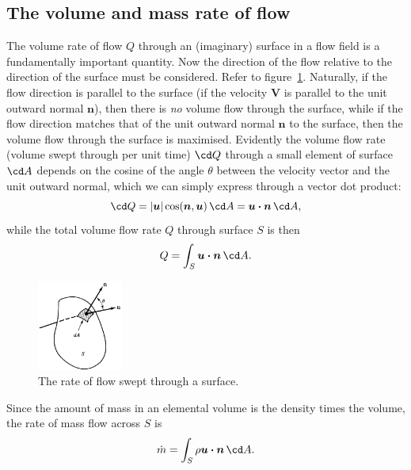 \documentclass[a4paper,11pt]		{report}
\begin{document}
\subsection{The volume and mass rate of flow}

The volume rate of flow $Q$ through an (imaginary) surface in a flow
field is a fundamentally important quantity. Now the direction of the
flow relative to the direction of the surface must be
considered. Refer to figure~\ref{fig.flowQ}. Naturally, if the flow
direction is parallel to the surface (\ie if the velocity $\bm{V}$ is
parallel to the unit outward normal $\bm{n}$), then there is \emph{no}
volume flow through the surface, while if the flow direction matches
that of the unit outward normal $\bm{n}$ to the surface, then the
volume flow through the surface is maximised. Evidently the volume
flow rate (volume swept through per unit time) $\cd Q$ through a small
element of surface $\cd A$ depends on the cosine of the angle $\theta$
between the velocity vector and the unit outward normal, which we can
simply express through a vector dot product:
\[
\cd Q=|\bm{u}| \cos(\bm{n}, \bm{u})\,\cd A = \bm{u\cdot n}\,\cd A,
\]
while the total volume flow rate $Q$ through surface $S$ is then
\[
Q = \int_S \bm{u\cdot n}\,\cd A.
\]

\begin{figure}
\begin{center}
\includegraphics[width=0.25\textwidth]{White-1.3a.eps}
\end{center}
\caption{The rate of flow swept through a surface. \citep[From][]{white86}}
\label{fig.flowQ}
\end{figure}

Since the amount of mass in an elemental volume is the density times
the volume, the rate of mass flow across $S$ is
\[
\dot{m}=\int_S \rho\bm{u\cdot n}\,\cd A.
\]


\end{document}
